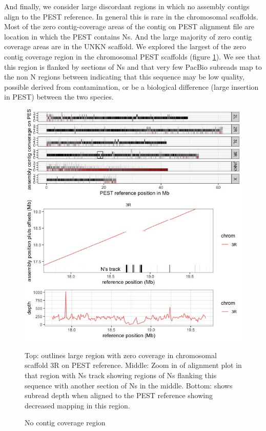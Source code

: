 \par{
And finally, we consider large discordant regions in which no assembly contigs align to the PEST reference. In general this is rare in the chromosomal scaffolds. Most of the zero contig-coverage areas of the contig on PEST alignment file are location in which the PEST contains Ns. And the large majority of zero contig coverage areas are in the UNKN scaffold. We explored the largest of the zero contig coverage region in the chromosomal PEST scaffolds (figure \ref{figure:nocovplot}). We see that this region is flanked by sections of Ns and that very few PacBio subreads map to the non N regions between indicating that this sequence may be low quality, possible derived from contamination, or be a biological difference (large insertion in PEST) between the two species.
}

\begin{figure}[htbp!]

\caption{No contig coverage region}
\label{figure:nocovplot}
\begin{centering}
\includegraphics[width=1.0\textwidth]{Nocovplot.jpeg}
\par{ Top: outlines large region with zero coverage in chromosomal scaffold 3R on PEST reference. Middle: Zoom in of alignment plot in that region with Ns track showing regions of Ns flanking this sequence with another section of Ns in the middle. Bottom: shows subread depth when aligned to the PEST reference showing decreased mapping in this region.}
\end{centering}
\end{figure}



